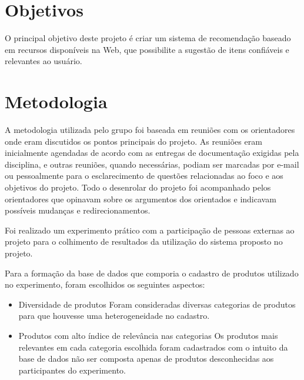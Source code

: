 

\section{Objetivos} %
\label{sec:objetivos}

 O principal objetivo deste projeto é criar um sistema de recomendação baseado em recursos disponíveis na Web, que possibilite a sugestão de itens confiáveis e relevantes ao usuário.



\section{Metodologia} %
\label{sec:metodologia}

 A metodologia utilizada pelo grupo foi baseada em reuniões com os orientadores onde eram discutidos os pontos principais do projeto. As reuniões eram inicialmente agendadas de acordo com as entregas de documentação exigidas pela disciplina, e outras reuniões, quando necessárias, podiam ser marcadas por e-mail ou pessoalmente para o esclarecimento de questões relacionadas ao foco e aos objetivos do projeto. Todo o desenrolar do projeto foi acompanhado pelos orientadores que opinavam sobre os argumentos dos orientados e indicavam possíveis mudanças e redirecionamentos.

 Foi realizado um experimento prático com a participação de pessoas externas ao projeto para o colhimento de resultados da utilização do sistema proposto no projeto.

 Para a formação da base de dados que comporia o cadastro de produtos utilizado no experimento, foram escolhidos os seguintes aspectos:

\begin{itemize}
	\item Diversidade de produtos
	\subitem Foram consideradas diversas categorias de produtos para que houvesse uma heterogeneidade no cadastro.
	\item Produtos com alto índice de relevância nas categorias
	\subitem Os produtos mais relevantes em cada categoria escolhida foram cadastrados com o intuito da base de dados não ser composta apenas de produtos desconhecidas aos participantes do experimento.
\end{itemize}

